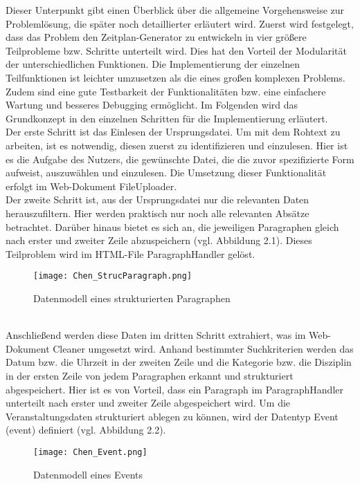 Dieser Unterpunkt gibt einen Überblick über die allgemeine Vorgehensweise zur Problemlösung, die später noch detaillierter erläutert wird. 
Zuerst wird festgelegt, dass das Problem den Zeitplan-Generator zu entwickeln in vier größere Teilprobleme bzw. Schritte unterteilt wird. Dies hat den Vorteil der Modularität der unterschiedlichen Funktionen. Die Implementierung der einzelnen Teilfunktionen ist leichter umzusetzen als die eines großen komplexen Problems. Zudem sind eine gute Testbarkeit der Funktionalitäten bzw. eine einfachere Wartung und besseres Debugging ermöglicht. Im Folgenden wird das Grundkonzept in den einzelnen Schritten für die Implementierung erläutert.\\
Der erste Schritt ist das Einlesen der Ursprungsdatei. Um mit dem Rohtext zu arbeiten, ist es notwendig, diesen zuerst zu identifizieren und einzulesen. Hier ist es die Aufgabe des Nutzers, die gewünschte Datei, die die zuvor spezifizierte Form aufweist, auszuwählen und einzulesen. Die Umsetzung dieser Funktionalität erfolgt im Web-Dokument FileUploader.\\ 
Der zweite Schritt ist, aus der Ursprungsdatei nur die relevanten Daten herauszufiltern. Hier werden praktisch nur noch alle relevanten Absätze betrachtet. Darüber hinaus bietet es sich an, die jeweiligen Paragraphen gleich nach erster und zweiter Zeile abzuspeichern (vgl. Abbildung 2.1). Dieses Teilproblem wird im HTML-File ParagraphHandler gelöst.
\begin{figure}[htbp]
  \centering
  \texttt{[image: Chen\_StrucParagraph.png]}
  \caption{Datenmodell eines strukturierten Paragraphen}
  \label{fig:Fig1}
\end{figure}\\
Anschließend werden diese Daten im dritten Schritt extrahiert, was im Web-Dokument Cleaner umgesetzt wird. Anhand bestimmter Suchkriterien werden das Datum bzw. die Uhrzeit in der zweiten Zeile und die Kategorie bzw. die Disziplin in der ersten Zeile von jedem Paragraphen erkannt und strukturiert abgespeichert. Hier ist es von Vorteil, dass ein Paragraph im ParagraphHandler unterteilt nach erster und zweiter Zeile abgespeichert wird. Um die Veranstaltungsdaten strukturiert ablegen zu können, wird der Datentyp Event (event) definiert (vgl. Abbildung 2.2).
\begin{figure}[htbp]
  \centering
  \texttt{[image: Chen\_Event.png]}
  \caption{Datenmodell eines Events}
  \label{fig:Fig1}
\end{figure}\\
